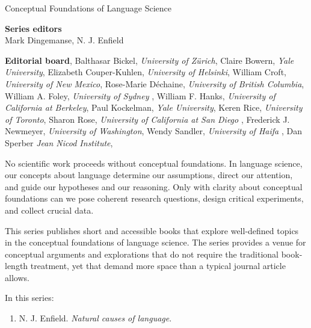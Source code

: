 {\large Conceptual Foundations of Language Science}

\bigskip

\textbf{Series editors}\\
Mark Dingemanse, %
N. J. Enfield %


\bigskip


\textbf{Editorial board},  
Balthasar Bickel, \textit{University of Zürich},    
Claire Bowern, \textit{Yale University},           
Elizabeth Couper-Kuhlen, \textit{University of Helsinki},     
William Croft, \textit{University of New Mexico},             
Rose-Marie Déchaine, \textit{University of British Columbia},       
William A. Foley, \textit{University of Sydney} ,                   
William F. Hanks, \textit{University of California at Berkeley},    
Paul Kockelman, \textit{Yale University},            
Keren Rice, \textit{University of Toronto},          
Sharon Rose, \textit{University of California at San Diego },        
Frederick J. Newmeyer, \textit{University of Washington},         
Wendy Sandler, \textit{University of Haifa },             
Dan Sperber \textit{Jean Nicod Institute},      


\bigskip

\begin{minipage}{\textwidth}%

No scientific work proceeds without conceptual foundations. In language science, our concepts about language determine our assumptions, direct our attention, and guide our hypotheses and our reasoning. Only with clarity about conceptual foundations can we pose coherent research questions, design critical experiments, and collect crucial data. 

\medskip

This series publishes short and accessible books that explore well-defined topics in the conceptual foundations of language science. The series provides a venue for conceptual arguments and explorations that do not require the traditional book-length treatment, yet that demand more space than a typical journal article allows.  
\end{minipage}

\bigskip

In this series:

\begin{enumerate}
\item N. J. Enfield. \textit{Natural causes of language}.

\end{enumerate}


